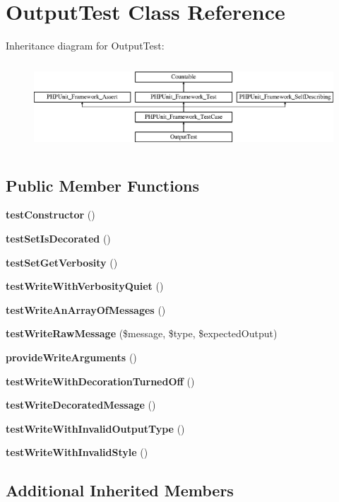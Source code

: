 \section{Output\+Test Class Reference}
\label{class_symfony_1_1_component_1_1_console_1_1_tests_1_1_output_1_1_output_test}
Inheritance diagram for Output\+Test\+:\begin{figure}[H]
\begin{center}
\leavevmode
\includegraphics[height=3.303835cm]{class_symfony_1_1_component_1_1_console_1_1_tests_1_1_output_1_1_output_test}
\end{center}
\end{figure}
\subsection*{Public Member Functions}
\begin{DoxyCompactItemize}
\item 
{\bf test\+Constructor} ()
\item 
{\bf test\+Set\+Is\+Decorated} ()
\item 
{\bf test\+Set\+Get\+Verbosity} ()
\item 
{\bf test\+Write\+With\+Verbosity\+Quiet} ()
\item 
{\bf test\+Write\+An\+Array\+Of\+Messages} ()
\item 
{\bf test\+Write\+Raw\+Message} (\$message, \$type, \$expected\+Output)
\item 
{\bf provide\+Write\+Arguments} ()
\item 
{\bf test\+Write\+With\+Decoration\+Turned\+Off} ()
\item 
{\bf test\+Write\+Decorated\+Message} ()
\item 
{\bf test\+Write\+With\+Invalid\+Output\+Type} ()
\item 
{\bf test\+Write\+With\+Invalid\+Style} ()
\end{DoxyCompactItemize}
\subsection*{Additional Inherited Members}


